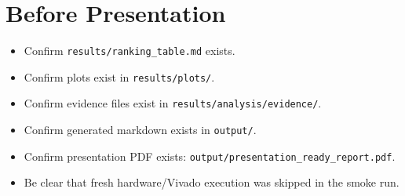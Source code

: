 \documentclass[11pt]{article}
\begin{document}
\section*{Before Presentation}
\begin{itemize}
\item Confirm \texttt{results/ranking\_table.md} exists.
\item Confirm plots exist in \texttt{results/plots/}.
\item Confirm evidence files exist in \texttt{results/analysis/evidence/}.
\item Confirm generated markdown exists in \texttt{output/}.
\item Confirm presentation PDF exists: \texttt{output/presentation\_ready\_report.pdf}.
\item Be clear that fresh hardware/Vivado execution was skipped in the smoke run.
\end{itemize}
\end{document}
